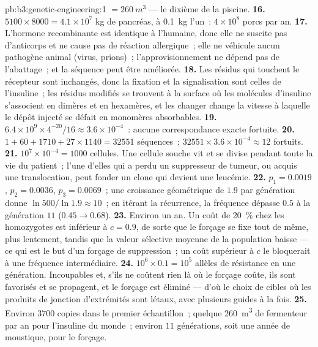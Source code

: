 \begin{solution}{pb:b3:genetic-engineering:1}
$= \qty{260}{m^3}$ --- le dixième de la piscine.
\textbf{16.} $5100\times 8000 = 4.1\times 10^{7}$ kg de pancréas, à
\qty{0.1}{kg} l'un~: $4\times 10^{8}$ porcs par an.
\textbf{17.} L'hormone recombinante est identique à l'humaine, donc
elle ne suscite pas d'anticorps et ne cause pas de réaction
allergique~; elle ne véhicule aucun pathogène animal (virus, prions)~;
l'approvisionnement ne dépend pas de l'abattage~; et la séquence peut
être améliorée.
\textbf{18.} Les résidus qui touchent le récepteur sont inchangés, donc
la fixation et la signalisation sont celles de l'insuline~; les résidus
modifiés se trouvent à la surface où les molécules d'insuline
s'associent en dimères et en hexamères, et les changer change la
vitesse à laquelle le dépôt injecté se défait en monomères
absorbables.
\textbf{19.} $6.4\times 10^{9}\times 4^{-20}/16 \approx 3.6\times
10^{-4}$~: aucune correspondance exacte fortuite.
\textbf{20.} $1 + 60 + 1710 + 27\times 1140 = \num{32551}$ séquences~;
$\num{32551}\times 3.6\times 10^{-4} \approx 12$ 
fortuits.
\textbf{21.} $10^{7}\times 10^{-4} = 1000$ cellules. Une cellule souche
vit et se divise pendant toute la vie du patient~; l'une d'elles qui a
perdu un suppresseur de tumeur, ou acquis une translocation, peut
fonder un clone qui devient une leucémie.
\textbf{22.} $p_{1} = 0.0019$, $p_{2} = 0.0036$, $p_{3} = 0.0069$~; une
croissance géométrique de $1.9$ par génération donne $\ln 500/\ln 1.9
\approx 10$~; en itérant la récurrence, la fréquence dépasse $0.5$ à la
génération $11$ ($0.45 \to 0.68$).
\textbf{23.} Environ un an. Un coût de \qty{20}{\%} chez les
homozygotes est inférieur à $c = 0.9$, de sorte que le forçage se fixe
tout de même, plus lentement, tandis que la valeur sélective moyenne de
la population baisse --- ce qui est le but d'un forçage de
suppression~; un coût supérieur à $c$ le bloquerait à une fréquence
intermédiaire.
\textbf{24.} $10^{6}\times 0.1 = 10^{5}$ allèles de résistance en une
génération. Incoupables et, s'ils ne coûtent rien là où le forçage
coûte, ils sont favorisés et se propagent, et le forçage est éliminé
--- d'où le choix de cibles où les produits de jonction d'extrémités
sont létaux, avec plusieurs guides à la fois.
\textbf{25.} Environ $3700$ copies dans le premier échantillon~; quelque
\qty{260}{m^3} de fermenteur par an pour l'insuline du monde~; environ
$11$ générations, soit une année de moustique, pour le forçage.
\end{solution}
